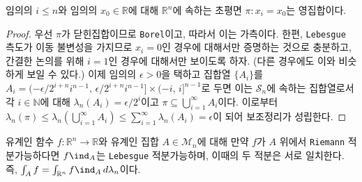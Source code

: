 \begin{lemma}\label{lem:ReimannIntegrable}
    임의의 $i\leq n$와 임의의 $x_0\in\mathbb{R}$에 대해 $\mathbb{R}^n$에 속하는 초평면 $\pi:x_i=x_0$는 영집합이다.
\end{lemma}

\begin{proof}
    우선 $\pi$가 닫힌집합이므로 \texttt{Borel}이고, 따라서 이는 가측이다. 한편, \texttt{Lebesgue} 측도가 이동 불변성을 가지므로 $x_i=0$인 경우에 대해서만 증명하는 것으로 충분하고, 간결한 논의를 위해 $i=1$인 경우에 대해서만 보이도록 하자. (다른 경우에도 이와 비슷하게 보일 수 있다.) 이제 임의의 $\epsilon>0$을 택하고 집합열 $\{A_i\}$를 $A_i=(-\epsilon/2^{i+n}i^{n-1},\,\epsilon/2^{i+n}i^{n-1}]\times(-i,\,i]^{n-1}$로 두면 이는 $\mathcal{S}_n$에 속하는 집합열로서 각 $i\in\mathbb{N}$에 대해 $\lambda_n(A_i)=\epsilon/2^i$이고 $\pi\subseteq\bigcup_{i=1}^\infty A_i$이다. 이로부터 $\lambda_n(\pi)\leq\lambda_n(\bigcup_{i=1}^\infty A_i)\leq\sum_{i=1}^\infty\lambda_n(A_i)=\epsilon$이 되어 보조정리가 성립한다.
\end{proof}

\begin{theorem}\label{thm:ReimannIntegrable}
    유계인 함수 $f:\mathbb{R}^n\to\mathbb{R}$와 유계인 집합 $A\in\mathcal{M}_n$에 대해 만약 $f$가 $A$ 위에서 \texttt{Riemann} 적분가능하다면 $f\ind_A$는 \texttt{Lebesgue} 적분가능하며, 이때의 두 적분은 서로 일치한다. 즉, $\int_Af=\int_{\mathbb{R}^n}f\ind_A\,d\lambda_n$이다.
\end{theorem}

